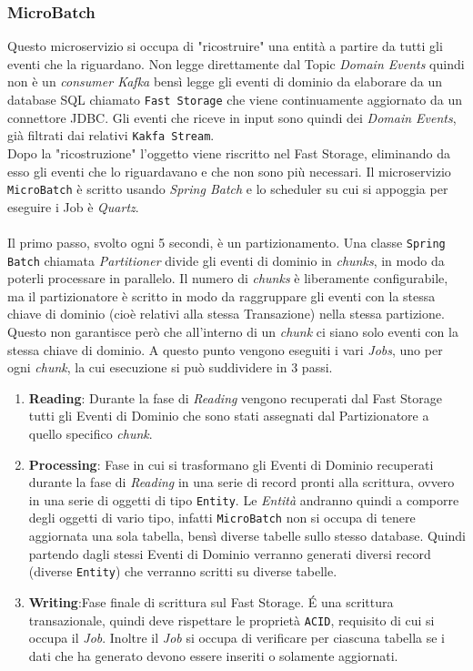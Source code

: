 \subsubsection{MicroBatch}
\label{subsubsec:micro_batch}
Questo microservizio si occupa di "ricostruire" una entità a partire da tutti gli eventi che la riguardano. 
Non legge direttamente dal Topic \textit{Domain Events} quindi non è un \textit{consumer Kafka} bensì legge gli eventi di dominio da elaborare da un database SQL chiamato \texttt{Fast Storage}
che viene continuamente aggiornato da un connettore JDBC.
Gli eventi che riceve in input sono quindi dei \textit{Domain Events}, già filtrati dai relativi \texttt{Kakfa Stream}.\\
Dopo la "ricostruzione" l'oggetto viene riscritto nel Fast Storage, eliminando da esso gli eventi che lo riguardavano e che non sono più necessari.
Il microservizio \texttt{MicroBatch} è scritto usando \textit{Spring Batch} e lo scheduler su cui si appoggia per eseguire i Job è \textit{Quartz}.\\\\
Il primo passo, svolto ogni 5 secondi, è un partizionamento. Una classe \texttt{Spring Batch} chiamata \textit{Partitioner} divide gli eventi di dominio in \textit{chunks}, in modo da poterli processare in parallelo.
Il numero di \textit{chunks} è liberamente configurabile, ma il partizionatore è scritto in modo da raggruppare gli eventi con la stessa chiave di dominio (cioè relativi alla stessa Transazione) nella stessa partizione.
Questo non garantisce però che all'interno di un \textit{chunk} ci siano solo eventi con la stessa chiave di dominio.
A questo punto vengono eseguiti i vari \textit{Jobs}, uno per ogni \textit{chunk}, la cui esecuzione si può suddividere in 3 passi.
\begin{enumerate}
    \item \textbf{Reading}: Durante la fase di \textit{Reading} vengono recuperati dal Fast Storage tutti gli Eventi di Dominio che sono stati assegnati dal Partizionatore a quello specifico \textit{chunk}.
    \item \textbf{Processing}: Fase in cui si trasformano gli Eventi di Dominio recuperati durante la fase di \textit{Reading} in una serie di record pronti alla scrittura, ovvero in una serie di oggetti di tipo \texttt{Entity}.
    Le \textit{Entità} andranno quindi a comporre degli oggetti di vario tipo, infatti \texttt{MicroBatch} non si occupa di tenere aggiornata una sola tabella, bensì diverse tabelle sullo stesso database.
    Quindi partendo dagli stessi Eventi di Dominio verranno generati diversi record (diverse \texttt{Entity}) che verranno scritti su diverse tabelle.
    \item \textbf{Writing}:Fase finale di scrittura sul Fast Storage. É una scrittura transazionale, quindi deve rispettare le proprietà \texttt{ACID}, requisito di cui si occupa il \textit{Job}.
    Inoltre il \textit{Job} si occupa di verificare per ciascuna tabella se i dati che ha generato devono essere inseriti o solamente aggiornati.
\end{enumerate}

